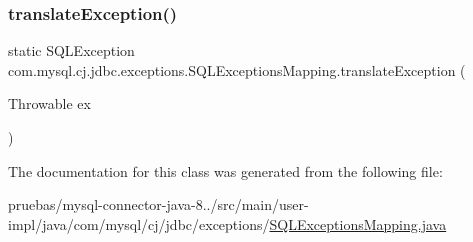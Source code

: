 \mbox{\label{classcom_1_1mysql_1_1cj_1_1jdbc_1_1exceptions_1_1_s_q_l_exceptions_mapping_ac678ac3e495c6fd3cc53982eb2afb138}} 
\subsubsection{\texorpdfstring{translate\+Exception()}{translateException()}\hspace{0.1cm}{\footnotesize\ttfamily [2/2]}}
{\footnotesize\ttfamily static S\+Q\+L\+Exception com.\+mysql.\+cj.\+jdbc.\+exceptions.\+S\+Q\+L\+Exceptions\+Mapping.\+translate\+Exception (\begin{DoxyParamCaption}\item[{Throwable}]{ex }\end{DoxyParamCaption})\hspace{0.3cm}{\ttfamily [static]}}



The documentation for this class was generated from the following file\+:\begin{DoxyCompactItemize}
\item 
pruebas/mysql-\/connector-\/java-\/8../src/main/user-\/impl/java/com/mysql/cj/jdbc/exceptions/\mbox{\hyperlink{_s_q_l_exceptions_mapping_8java}{S\+Q\+L\+Exceptions\+Mapping.\+java}}\end{DoxyCompactItemize}
